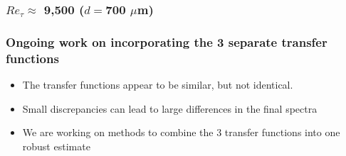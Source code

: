 \documentclass[aspectratio=169,9pt]{beamer}
\begin{document}
\begin{frame}
  \frametitle{$Re_\tau \approx$ 9,500 ($d=$700 $\mu$m)}
\end{frame}

\begin{frame}
  \frametitle{Ongoing work on incorporating the 3 separate transfer functions}
  \begin{itemize}
    \item The transfer functions appear to be similar, but not identical.
    \item Small discrepancies can lead to large differences in the final spectra
    \item We are working on methods to combine the 3 transfer functions into one robust estimate
  \end{itemize}
\end{frame}
\end{document}
